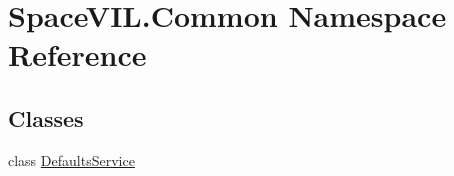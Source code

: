 \hypertarget{namespace_space_v_i_l_1_1_common}{}\section{Space\+V\+I\+L.\+Common Namespace Reference}
\label{namespace_space_v_i_l_1_1_common}
\subsection*{Classes}
\begin{DoxyCompactItemize}
\item 
class \mbox{\hyperlink{class_space_v_i_l_1_1_common_1_1_defaults_service}{Defaults\+Service}}
\end{DoxyCompactItemize}
